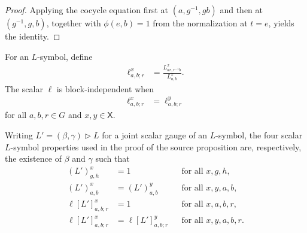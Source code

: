 \begin{proof}\leanok
    Applying the cocycle equation first at $(a,g^{-1},gb)$ and then at
    $(g^{-1},g,b)$, together with $\phi(e,b)=1$ from the normalization at
    $t=e$, yields the identity.
\end{proof}

\begin{definition}
    \label{def:mpug_block_independence_factor}
    \leanok
    For an $L$-symbol, define
    \begin{align}
        \ell^x_{a,b;r}
         & =\frac{L^x_{ar,r^{-1}b}}{L^x_{a,b}}.
        \label{eq:mpug_block_scalar}
    \end{align}
    The scalar $\ell$ is block-independent when
    \begin{align}
        \ell^x_{a,b;r}
         & =\ell^y_{a,b;r}
        \label{eq:mpug_block_independence}
    \end{align}
    for all $a,b,r\in G$ and $x,y\in\mathsf X$.
\end{definition}

\begin{definition}
    \label{def:mpug_block_independence_gauge_forms}
    \leanok
    Writing $L'=(\beta,\gamma)\mathbin{\triangleright}L$ for a joint scalar
    gauge of an $L$-symbol, the four scalar $L$-symbol properties used in the
    proof of the source proposition are, respectively, the existence of $\beta$
    and $\gamma$ such that
    \begin{align}
        (L')^x_{g,h}       & =1
                           &                     & \text{for all $x,g,h$},
        \label{eq:mpug_block_form_trivial}                                     \\
        (L')^x_{a,b}       & =(L')^y_{a,b}
                           &                     & \text{for all $x,y,a,b$},
        \label{eq:mpug_block_form_constant}                                    \\
        \ell[L']^x_{a,b;r} & =1
                           &                     & \text{for all $x,a,b,r$},
        \label{eq:mpug_block_form_trivial_ell}                                 \\
        \ell[L']^x_{a,b;r} & =\ell[L']^y_{a,b;r}
                           &                     & \text{for all $x,y,a,b,r$}.
        \label{eq:mpug_block_form_independent_ell}
    \end{align}
\end{definition}

